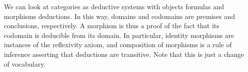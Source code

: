 \begin{example}
  \label{ex:category-deductive-system}



  We can look at categories as deductive systems with objects formulas
  and morphisms deductions. In this way, domains and co\-do\-mains are
  premises and conclusions, respectively. A morphism is thus a proof
  of the fact that its codomain is deducible from its domain. In
  particular, identity morphisms are instances of the reflexivity
  axiom, and composition of morphisms is a rule of inference asserting
  that deductions are transitive. Note that this is just a change of
  vocabulary.

\end{example}

